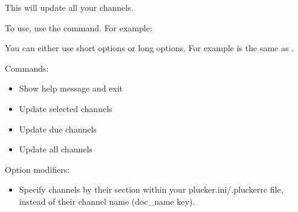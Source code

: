 This will update all your channels.

To use, use the  command. For example:




You can either use short options or long options. For example  is 
the same as .

Commands:

\begin{itemize}
  \item {} Show help message and exit
  \item {} Update selected channels
  \item {} Update due channels
  \item {} Update all channels
\end{itemize} 

Option modifiers:

\begin{itemize}
  \item {} Specify channels by their section within 
  your plucker.ini/.pluckerrc file, instead of their channel name (doc\_name key).
\end{itemize} 



